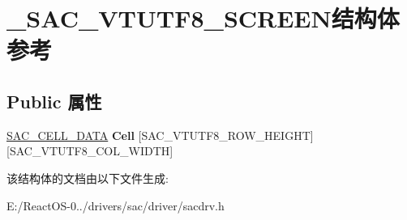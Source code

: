 \hypertarget{struct___s_a_c___v_t_u_t_f8___s_c_r_e_e_n}{}\section{\+\_\+\+S\+A\+C\+\_\+\+V\+T\+U\+T\+F8\+\_\+\+S\+C\+R\+E\+E\+N结构体 参考}
\label{struct___s_a_c___v_t_u_t_f8___s_c_r_e_e_n}
\subsection*{Public 属性}
\begin{DoxyCompactItemize}
\item 
\mbox{\label{struct___s_a_c___v_t_u_t_f8___s_c_r_e_e_n_a0745030bf36ab8364d50efaf5d3a9203}} 
\hyperlink{struct___s_a_c___c_e_l_l___d_a_t_a}{S\+A\+C\+\_\+\+C\+E\+L\+L\+\_\+\+D\+A\+TA} {\bfseries Cell} \mbox{[}S\+A\+C\+\_\+\+V\+T\+U\+T\+F8\+\_\+\+R\+O\+W\+\_\+\+H\+E\+I\+G\+HT\mbox{]}\mbox{[}S\+A\+C\+\_\+\+V\+T\+U\+T\+F8\+\_\+\+C\+O\+L\+\_\+\+W\+I\+D\+TH\mbox{]}
\end{DoxyCompactItemize}


该结构体的文档由以下文件生成\+:\begin{DoxyCompactItemize}
\item 
E\+:/\+React\+O\+S-\/0../drivers/sac/driver/sacdrv.\+h\end{DoxyCompactItemize}
